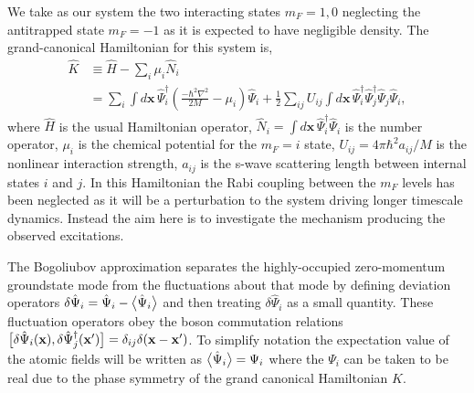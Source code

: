 We take as our system the two interacting states $m_F=1, 0$ neglecting the antitrapped state $m_F=-1$ as it is expected to have negligible density. The grand-canonical Hamiltonian for this system is,
\begin{align}
    \hat{K} &\equiv \hat{H} - \sum_i \mu_i \hat{N}_i\\
            &= \sum_i \int d\mathbf{x}\, \hat{\Psi}_i^\dagger \left(\frac{-\hbar^2 \nabla^2}{2 M} - \mu_i\right)\hat{\Psi}_i + \frac{1}{2} \sum_{i j} U_{i j}\int d\mathbf{x}\, \hat{\Psi}_i^\dagger \hat{\Psi}_j^\dagger \hat{\Psi}_j \hat{\Psi}_i,
\end{align}
where $\hat{H}$ is the usual Hamiltonian operator, $\displaystyle\hat{N}_i= \int d\mathbf{x}\, \hat{\Psi}_i^\dagger \hat{\Psi}_i$ is the number operator, $\mu_i$ is the chemical potential for the $m_F=i$ state, $U_{ij} = 4\pi \hbar^2 a_{ij}/M$ is the nonlinear interaction strength, $a_{ij}$ is the s-wave scattering length between internal states $i$ and $j$. In this Hamiltonian the Rabi coupling between the $m_F$ levels has been neglected as it will be a perturbation to the system driving longer timescale dynamics. Instead the aim here is to investigate the mechanism producing the observed excitations.

The Bogoliubov approximation separates the highly-occupied zero-momentum groundstate mode from the fluctuations about that mode by defining deviation operators $\delta\hat{\Psi}_i = \hat{\Psi}_i - \big<\hat{\Psi}_i\big>$ and then treating $\delta\hat{\Psi}_i$ as a small quantity. These fluctuation operators obey the boson commutation relations $\big[\delta\hat{\Psi}_i(\mathbf{x}), \delta \hat{\Psi}_j^\dagger(\mathbf{x}')\big] = \delta_{i j} \delta(\mathbf{x}-\mathbf{x}')$. To simplify notation the expectation value of the atomic fields will be written as $\big<\hat{\Psi}_i\big> = \Psi_i$ where the $\Psi_i$ can be taken to be real due to the phase symmetry of the grand canonical Hamiltonian $\hat{K}$.

